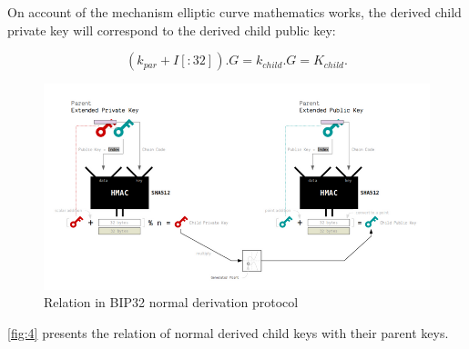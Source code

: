 On account of the mechanism elliptic curve mathematics works, the derived child private key will correspond to the derived child public key:

\begin{equation}
    (k_{par} + I[:32]) . G  =  k_{child} . G =  K_{child}.
\end{equation}

\bigskip
\begin{figure}[ht!]
    \centering
    \includegraphics[width=1\textwidth]{images/relation_bip32.png}
    \caption[Relation in BIP32 normal derivation protocol]{Relation in BIP32 normal derivation protocol \cite{learnme}}
    \label{fig:4}
\end{figure}

\autoref{fig:4} presents the relation of normal derived child keys with their parent keys.

